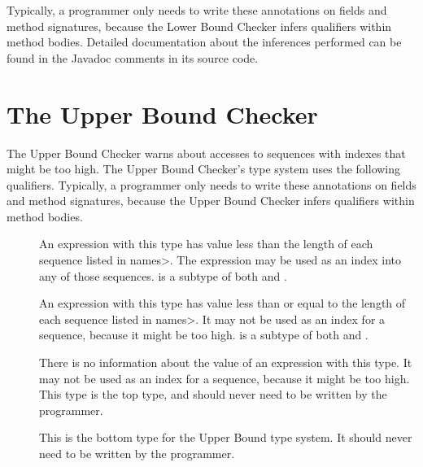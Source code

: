 
Typically, a programmer only needs to write these annotations on
fields and method signatures, because the Lower Bound Checker infers
qualifiers within method bodies.
Detailed documentation about the inferences performed can be found
in the Javadoc comments in its source code.


\section{The Upper Bound Checker\label{index-upperbound}}

The Upper Bound Checker warns about accesses to sequences with indexes that might be
too high.
The Upper Bound Checker's type system uses the following qualifiers.
Typically, a programmer only needs to write these annotations on
fields and method signatures, because the Upper Bound Checker infers
qualifiers within method bodies.

\begin{description}
\item[]
  An expression with this type
  has value less than the length of each sequence listed in \<names>.
  The expression may be used as an index into any of those sequences.
   is a subtype of both
   and .
\item[]
  An expression with this type
  has value less than or equal to the length of each sequence listed in \<names>.
  It may not be used as an index for a sequence, because it might be too high.
   is a subtype of both
   and .
\item[]
  There is no information about the value of an expression with this type.
  It may not be used as an index for a sequence, because it might be too high.
  This type is the top type, and should never need to be written by the
  programmer.
\item[]
  This is the bottom type for the Upper Bound type system. It should
  never need to be written by the programmer.
  \end{description}

